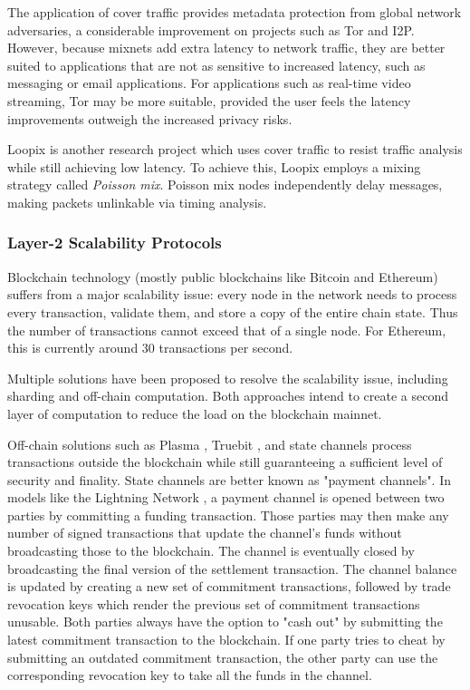 The application of cover traffic provides metadata protection from global network adversaries, a considerable improvement on projects such as Tor and I2P. However, because mixnets add extra latency to network traffic, they are better suited to applications that are not as sensitive to increased latency, such as messaging or email applications. For applications such as real-time video streaming, Tor may be more suitable, provided the user feels the latency improvements outweigh the increased privacy risks.

Loopix \cite{loopix} is another research project which uses cover traffic to resist traffic analysis while still achieving low latency. To achieve this, Loopix employs a mixing strategy called \textit{Poisson mix}. Poisson mix nodes independently delay messages, making packets unlinkable via timing analysis.

\subsubsection{Layer-2 Scalability Protocols}
\label{sec:l2protocols}

Blockchain technology (mostly public blockchains like Bitcoin and Ethereum) suffers from a major scalability issue: every node in the network needs to process every transaction, validate them, and store a copy of the entire chain state. Thus the number of transactions cannot exceed that of a single node. For Ethereum, this is currently around 30 transactions per second.

Multiple solutions have been proposed to resolve the scalability issue, including sharding and off-chain computation. Both approaches intend to create a second layer of computation to reduce the load on the blockchain mainnet.

Off-chain solutions such as Plasma \cite{plasma}, Truebit \cite{truebit}, and state channels process transactions outside the blockchain while still guaranteeing a sufficient level of security and finality. State channels are better known as "payment channels". In models like the Lightning Network \cite{lightningnetwork}, a payment channel is opened between two parties by committing a funding transaction. Those parties may then make any number of signed transactions that update the channel's funds without broadcasting those to the blockchain. The channel is eventually closed by broadcasting the final version of the settlement transaction. The channel balance is updated by creating a new set of commitment transactions, followed by trade revocation keys which render the previous set of commitment transactions unusable. Both parties always have the option to "cash out" by submitting the latest commitment transaction to the blockchain. If one party tries to cheat by submitting an outdated commitment transaction, the other party can use the corresponding revocation key to take all the funds in the channel.

